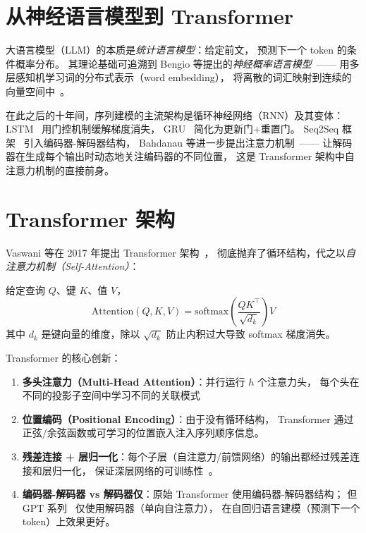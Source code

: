 \documentclass[10pt, openany]{book}
\begin{document}
\section{从神经语言模型到 Transformer}

大语言模型（LLM）的本质是\emph{统计语言模型}：给定前文，
预测下一个 token 的条件概率分布。
其理论基础可追溯到 Bengio 等提出的\emph{神经概率语言模型}~\cite{Bengio2003NNLM}——
用多层感知机学习词的分布式表示（word embedding），
将离散的词汇映射到连续的向量空间中~\cite{Mikolov2013Word2Vec}。

在此之后的十年间，序列建模的主流架构是循环神经网络（RNN）及其变体：
LSTM~\cite{Hochreiter1997LSTM} 用门控机制缓解梯度消失，
GRU~\cite{Cho2014GRU} 简化为更新门+重置门。
Seq2Seq 框架~\cite{Sutskever2014Seq2Seq} 引入编码器-解码器结构，
Bahdanau 等进一步提出注意力机制~\cite{Bahdanau2015Attention}——
让解码器在生成每个输出时动态地关注编码器的不同位置，
这是 Transformer 架构中自注意力机制的直接前身。

\section{Transformer 架构}

Vaswani 等在 2017 年提出 Transformer 架构~\cite{Vaswani2017Attention}，
彻底抛弃了循环结构，代之以\emph{自注意力机制（Self-Attention）}：

\begin{definition}[缩放点积注意力]
给定查询 \(Q\)、键 \(K\)、值 \(V\)，
\[
\text{Attention}(Q,K,V) = \text{softmax}\!\left(\frac{QK^\top}{\sqrt{d_k}}\right) V
\]
其中 \(d_k\) 是键向量的维度，除以 \(\sqrt{d_k}\) 防止内积过大导致 softmax 梯度消失。
\end{definition}

\noindent Transformer 的核心创新：
\begin{enumerate}
    \item \textbf{多头注意力（Multi-Head Attention）}：并行运行 \(h\) 个注意力头，
        每个头在不同的投影子空间中学习不同的关联模式~\cite{Vaswani2017Attention}
    \item \textbf{位置编码（Positional Encoding）}：由于没有循环结构，
        Transformer 通过正弦/余弦函数或可学习的位置嵌入注入序列顺序信息。
    \item \textbf{残差连接 + 层归一化}：每个子层（自注意力/前馈网络）的输出都经过残差连接和层归一化，
        保证深层网络的可训练性~\cite{Vaswani2017Attention}。
    \item \textbf{编码器-解码器 vs 解码器仅}：原始 Transformer 使用编码器-解码器结构；
        但 GPT 系列~\cite{Radford2018GPT,Radford2019GPT2,Brown2020LanguageModels} 仅使用解码器（单向自注意力），
        在自回归语言建模（预测下一个 token）上效果更好。
\end{enumerate}
\end{document}

